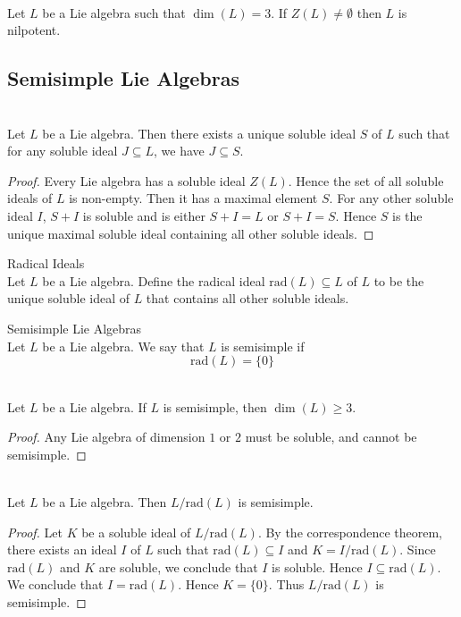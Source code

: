 \documentclass[a4paper]{article}
\begin{document}
\begin{lmm}{}{} \\Let $L$ be a Lie algebra such that $\dim(L)=3$. If $Z(L)\neq\emptyset$ then $L$ is nilpotent. 
\end{lmm}

\subsection{Semisimple Lie Algebras}
\begin{lmm}{}{} \\Let $L$ be a Lie algebra. Then there exists a unique soluble ideal $S$ of $L$ such that for any soluble ideal $J\subseteq L$, we have $J\subseteq S$. 
\begin{proof}
Every Lie algebra has a soluble ideal $Z(L)$. Hence the set of all soluble ideals of $L$ is non-empty. Then it has a maximal element $S$. For any other soluble ideal $I$, $S+I$ is soluble and is either $S+I=L$ or $S+I=S$. Hence $S$ is  the unique maximal soluble ideal containing all other soluble ideals. 
\end{proof}
\end{lmm}

\begin{defn}{Radical Ideals}{} \\Let $L$ be a Lie algebra. Define the radical ideal $\text{rad}(L)\subseteq L$ of $L$ to be the unique soluble ideal of $L$ that contains all other soluble ideals. 
\end{defn}

\begin{defn}{Semisimple Lie Algebras}{}{} \\Let $L$ be a Lie algebra. We say that $L$ is semisimple if $$\text{rad}(L)=\{0\}$$
\end{defn}

\begin{lmm}{}{} \\Let $L$ be a Lie algebra. If $L$ is semisimple, then $\dim(L)\geq 3$. 
\begin{proof}
Any Lie algebra of dimension $1$ or $2$ must be soluble, and cannot be semisimple. 
\end{proof}
\end{lmm}

\begin{lmm}{}{} \\Let $L$ be a Lie algebra. Then $L/\text{rad}(L)$ is semisimple. 
\begin{proof}
Let $K$ be a soluble ideal of $L/\text{rad}(L)$. By the correspondence theorem, there exists an ideal $I$ of $L$ such that $\text{rad}(L)\subseteq I$ and $K=I/\text{rad}(L)$. Since $\text{rad}(L)$ and $K$ are soluble, we conclude that $I$ is soluble. Hence $I\subseteq\text{rad}(L)$. We conclude that $I=\text{rad}(L)$. Hence $K=\{0\}$. Thus $L/\text{rad}(L)$ is semisimple. 
\end{proof}
\end{lmm}
\end{document}
